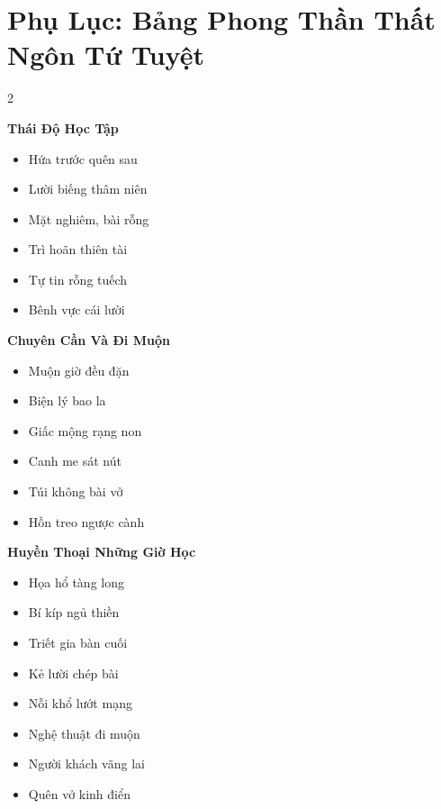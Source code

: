 \chapter*{Phụ Lục: Bảng Phong Thần Thất Ngôn Tứ Tuyệt}

\begin{multicols}{2}
\raggedright
\textbf{\color{chapterline}Thái Độ Học Tập}
\begin{itemize}[leftmargin=1.2em, itemsep=0.1em, label=\textcolor{titlecolor}{\tiny$\blacksquare$}]
  \item Hứa trước quên sau
  \item Lười biếng thâm niên
  \item Mặt nghiêm, bài rỗng
  \item Trì hoãn thiên tài
  \item Tự tin rỗng tuếch
  \item Bênh vực cái lười
\end{itemize}
\vspace{0.8em}
\textbf{\color{chapterline}Chuyên Cần Và Đi Muộn}
\begin{itemize}[leftmargin=1.2em, itemsep=0.1em, label=\textcolor{titlecolor}{\tiny$\blacksquare$}]
  \item Muộn giờ đều đặn
  \item Biện lý bao la
  \item Giấc mộng rạng non
  \item Canh me sát nút
  \item Túi không bài vở
  \item Hồn treo ngược cành
\end{itemize}
\vspace{0.8em}
\textbf{\color{chapterline}Huyền Thoại Những Giờ Học}
\begin{itemize}[leftmargin=1.2em, itemsep=0.1em, label=\textcolor{titlecolor}{\tiny$\blacksquare$}]
  \item Họa hổ tàng long
  \item Bí kíp ngủ thiền
  \item Triết gia bàn cuối
  \item Kẻ lười chép bài
  \item Nỗi khổ lướt mạng
  \item Nghệ thuật đi muộn
  \item Người khách vãng lai
  \item Quên vở kinh điển

\end{itemize}
\end{multicols}
